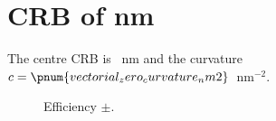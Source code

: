 \section{CRB of  nm}
The centre CRB is ~nm and the curvature
$c=\pnum{vectorial_zero_curvature_nm2}$~nm$^{-2}$.
\begin{figure}\caption{Efficiency $\pm$.}\end{figure}
